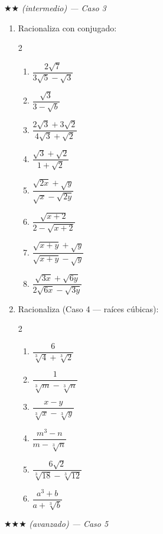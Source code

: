\documentclass[11pt, letterpaper]{article}
\begin{document}
$\bigstar\bigstar$ \textit{(intermedio) — Caso 3}

\begin{enumerate}[label=\textbf{\arabic*.}, leftmargin=*, resume]
  \item Racionaliza con conjugado:
  \begin{multicols}{2}
  \begin{enumerate}[label=\alph*)]
    \item $\dfrac{2\sqrt{7}}{3\sqrt{5}-\sqrt{3}}$
    \item $\dfrac{\sqrt{3}}{3-\sqrt{b}}$
    \item $\dfrac{2\sqrt{3}+3\sqrt{2}}{4\sqrt{3}+\sqrt{2}}$
    \item $\dfrac{\sqrt{3}+\sqrt{2}}{1+\sqrt{2}}$
    \item $\dfrac{\sqrt{2x}+\sqrt{y}}{\sqrt{x}-\sqrt{2y}}$
    \item $\dfrac{\sqrt{x+2}}{2-\sqrt{x+2}}$
    \item $\dfrac{\sqrt{x+y}+\sqrt{y}}{\sqrt{x+y}-\sqrt{y}}$
    \item $\dfrac{\sqrt{3x}+\sqrt{6y}}{2\sqrt{6x}-\sqrt{3y}}$
  \end{enumerate}
  \end{multicols}

  \item Racionaliza (Caso 4 — raíces cúbicas):
  \begin{multicols}{2}
  \begin{enumerate}[label=\alph*)]
    \item $\dfrac{6}{\sqrt[3]{4}+\sqrt[3]{2}}$
    \item $\dfrac{1}{\sqrt[3]{m}-\sqrt[3]{n}}$
    \item $\dfrac{x-y}{\sqrt[3]{x}-\sqrt[3]{y}}$
    \item $\dfrac{m^3-n}{m-\sqrt[3]{n}}$
    \item $\dfrac{6\sqrt{2}}{\sqrt[3]{18}-\sqrt[3]{12}}$
    \item $\dfrac{a^3+b}{a+\sqrt[3]{b}}$
  \end{enumerate}
  \end{multicols}
\end{enumerate}

$\bigstar\bigstar\bigstar$ \textit{(avanzado) — Caso 5}
\end{document}
